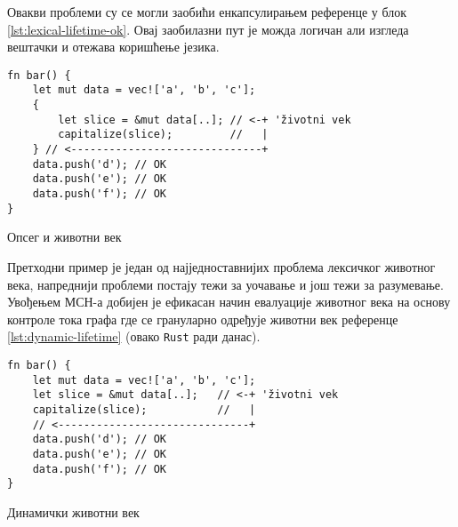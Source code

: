 Овакви проблеми су се могли заобићи енкапсулирањем референце у блок \ref{lst:lexical-lifetime-ok}. Овај заобилазни пут је можда логичан али изгледа вештачки и отежава коришћење језика. 

\begin{listing}[H]
\begin{verbatim}
fn bar() {
    let mut data = vec!['a', 'b', 'c'];
    {
        let slice = &mut data[..]; // <-+ 'životni vek
        capitalize(slice);         //   |
    } // <------------------------------+
    data.push('d'); // OK
    data.push('e'); // OK
    data.push('f'); // OK
}
\end{verbatim}
\caption{Опсег и животни век}
\label{lst:lexical-lifetime-ok}
\end{listing}

Претходни пример је један од најједноставнијих проблема лексичког животног века, напреднији проблеми постају тежи за уочавање и још тежи за разумевање.
Увођењем МСН-а добијен је ефикасан начин евалуације животног века на основу контроле тока графа где се грануларно одређује животни век референце \ref{lst:dynamic-lifetime} (овако \verb|Rust| ради данас).

\begin{listing}[H]
\begin{verbatim}
fn bar() {
    let mut data = vec!['a', 'b', 'c'];
    let slice = &mut data[..];   // <-+ 'životni vek
    capitalize(slice);           //   |
    // <------------------------------+
    data.push('d'); // OK
    data.push('e'); // OK
    data.push('f'); // OK
} 
\end{verbatim}
\caption{Динамички животни век}
\label{lst:dynamic-lifetime}
\end{listing}
